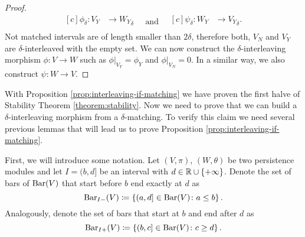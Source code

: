 \begin{proof}
\begin{equation*}
\begin{aligned}[c]
        \phi_\delta\colon V_Y &\to {W_Y}_\delta\\
        \end{aligned}
        \quad \text{and} \quad
        \begin{aligned}[c]
        \psi_\delta\colon W_Y &\to {V_Y}_\delta.\\
        \end{aligned}
    \end{equation*}
    Not matched intervals are of length smaller than $ 2 \delta $, therefore both, $V_N$ and $V_Y$ are $\delta$-interleaved with the empty set. We can now construct the $\delta$-interleaving morphism $ \phi\colon V \to W$ such as $\phi \vert_{V_Y} = \phi_Y$ and $\phi \vert_{V_N} = 0$. In a similar way, we also construct $ \psi\colon W \to V$.
\end{proof}

With Proposition \ref{prop:interleaving-if-matching} we have proven the first halve of Stability Theorem \ref{theorem:stability}. Now we need to prove that we can build a $\delta$-interleaving morphism from a $\delta$-matching. To verify this claim we need several previous lemmas that will lead us to prove Proposition \ref{prop:interleaving-if-matching}.

First, we will introduce some notation. Let $(V, \pi)$, $(W, \theta)$ be two persistence modules and let $ I = (b, d]$ be an interval with $ d \in \mathbb R \cup \{+ \infty\}$. Denote the set of bars of $\operatorname{Bar}(V)$ that start before $b$ end exactly at $d$ as
$$
    \operatorname{Bar}_{I-}(V) \coloneq \left\{ (a, d] \in \operatorname{Bar}(V) \colon a \leq b\right\}.
$$
Analogously, denote the set of bars that start at $b$ and end after $d$ as
$$
    \operatorname{Bar}_{I+}(V) \coloneq \left\{ (b, c] \in \operatorname{Bar}(V) \colon c \geq d\right\}.
$$

